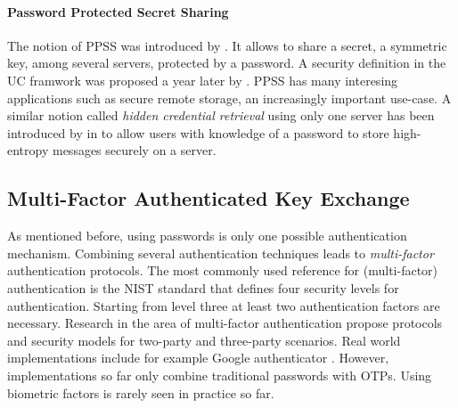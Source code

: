 \paragraph{Password Protected Secret Sharing}
The notion of \ac{PPSS} was introduced by \citeauthor{Bagherzandi2011} \cite{Bagherzandi2011}.
It allows to share a secret, \eg a symmetric key, among several servers, protected by a password. 
A security definition in the \acl{UC} framwork was proposed a year later by \citeauthor{Camenisch2012} \cite{Camenisch2012}.
\ac{PPSS} has many interesing applications such as secure remote storage, an increasingly important use-case.
A similar notion called \emph{hidden credential retrieval} using only one server has been introduced by \citeauthor{Boyen09} in \cite{Boyen09} to allow users with knowledge of a password to store high-entropy messages securely on a server.



\subsection{Multi-Factor Authenticated Key Exchange}
As mentioned before, using passwords is only one possible authentication mechanism.
Combining several authentication techniques leads to \emph{multi-factor} authentication protocols.
The most commonly used reference for (multi-factor) authentication is the \ac{NIST} standard \cite{Burr11} that defines four security levels for authentication.
Starting from level three at least two authentication factors are necessary.
Research in the area of multi-factor authentication \cite{PointchevalZ08,SUC10,LiuWM10,HaoC12} propose protocols and security models for two-party and three-party scenarios.
Real world implementations include for example Google authenticator \cite{GAuthenticator}.
However, implementations so far only combine traditional passwords with \aclp{OTP}.
Using biometric factors is rarely seen in practice so far.


